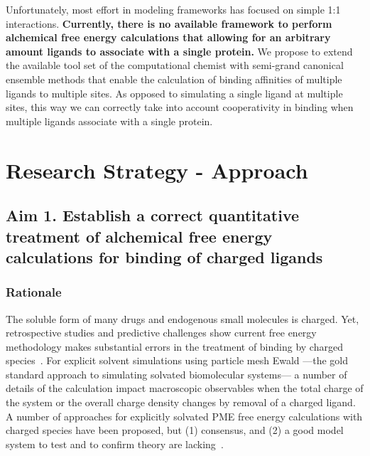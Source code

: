 \documentclass[10pt,final]{article}
\newif\ifinstr
\newcommand{\instr}[1]{\ifdraft{\ifinstr {\color{cyan}\emph{#1}} \fi}{}}
\begin{document}
Unfortunately, most effort in modeling frameworks has focused on simple 1:1 interactions. 
%
\textbf{Currently, there is no available framework to perform alchemical free energy calculations that allowing for an arbitrary amount ligands to associate with a single protein.}
%
We propose to extend the available tool set of the computational chemist with semi-grand canonical ensemble methods that enable the calculation of binding affinities of multiple ligands to multiple sites.
%
As opposed to simulating a single ligand at multiple sites, this way we can correctly take into account cooperativity in binding when multiple ligands associate with a single protein.

\section*{Research Strategy - Approach}
\instr{Approach: More specific background information. Describe in detail the experimental design and research methods to be used. Technical hurdles to be overcome should be mentioned. Alternative approaches should be given for experiments that may not be feasible. Discussion of expected or possible results and their interpretation. Best format for each specific aim: a) rationale, b) methods, c) expected results, d) alternatives. Theory aims should follow a similar structure where possible.}


\subsection*{Aim 1. Establish a correct quantitative treatment of alchemical free energy calculations for binding of charged ligands}
\subsubsection*{Rationale}
The soluble form of many drugs and endogenous small molecules is charged. Yet, retrospective studies and predictive challenges show current free energy methodology makes substantial errors in the treatment of binding by charged species~\autocite{Rocklin2013b,Muddana2014a}.
%
For explicit solvent simulations using particle mesh Ewald ---the gold standard approach to simulating solvated biomolecular systems--- a number of details of the calculation impact macroscopic observables when the total charge of the system or the overall charge density changes by removal of a charged ligand.
%
A number of approaches for explicitly solvated PME free energy calculations with charged species have been proposed, but (1) consensus, and (2) a good model system to test and to confirm theory are lacking~\autocite{Reif2013a, Rocklin2013a, Lin2014a}.
\end{document}
